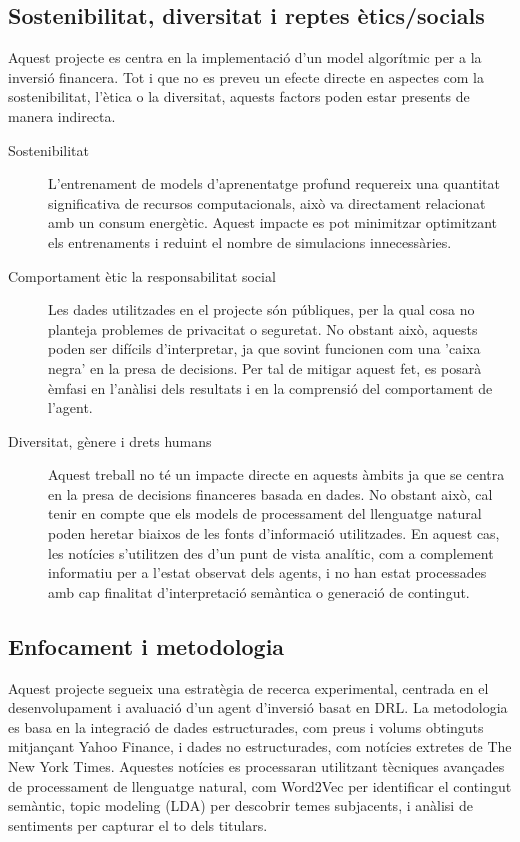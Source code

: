 \documentclass[12pt,a4paper,twoside]{book}
\begin{document}
\subsection{Sostenibilitat, diversitat i reptes ètics/socials}

Aquest projecte es centra en la implementació d'un model algorítmic per a la inversió financera. Tot i que no es preveu un efecte directe en aspectes com la sostenibilitat, l'ètica o la diversitat, aquests factors poden estar presents de manera indirecta.

\begin{description}
    \item[Sostenibilitat] L'entrenament de models d'aprenentatge profund requereix una quantitat significativa de recursos computacionals, això va directament relacionat amb un consum energètic. Aquest impacte es pot minimitzar optimitzant els entrenaments i reduint el nombre de simulacions innecessàries.
    \item[Comportament ètic la responsabilitat social] Les dades utilitzades en el projecte són públiques, per la qual cosa no planteja problemes de privacitat o seguretat. No obstant això, aquests poden ser difícils d'interpretar, ja que sovint funcionen com una 'caixa negra' en la presa de decisions. Per tal de mitigar aquest fet, es posarà èmfasi en l'anàlisi dels resultats i en la comprensió del comportament de l'agent.
    \item[Diversitat, gènere i drets humans] Aquest treball no té un impacte directe en aquests àmbits ja que se centra en la presa de decisions financeres basada en dades. No obstant això, cal tenir en compte que els models de processament del llenguatge natural poden heretar biaixos de les fonts d’informació utilitzades. En aquest cas, les notícies s'utilitzen des d’un punt de vista analític, com a complement informatiu per a l’estat observat dels agents, i no han estat processades amb cap finalitat d’interpretació semàntica o generació de contingut.

\end{description}

\subsection{Enfocament i metodologia}

Aquest projecte segueix una estratègia de recerca experimental, centrada en el desenvolupament i avaluació d'un agent d'inversió basat en DRL. La metodologia es basa en la integració de dades estructurades, com preus i volums obtinguts mitjançant Yahoo Finance\cite{YahooFinance}, i dades no estructurades, com notícies extretes de The New York Times\cite{NYTimes}. Aquestes notícies es processaran utilitzant tècniques avançades de processament de llenguatge natural, com Word2Vec per identificar el contingut semàntic, topic modeling (LDA) per descobrir temes subjacents, i anàlisi de sentiments per capturar el to dels titulars.
\end{document}
